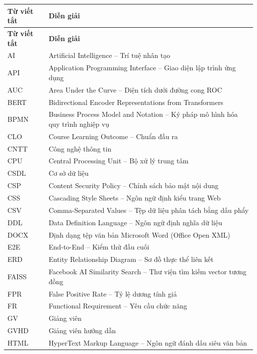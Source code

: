 \documentclass[../main.tex]{subfiles}
\begin{document}
{\renewcommand{\arraystretch}{1.15}
\begin{longtable}{|p{3cm}|p{11cm}|}
\hline
\textbf{Từ viết tắt} & \textbf{Diễn giải} \\
\hline
\endfirsthead
\hline
\textbf{Từ viết tắt} & \textbf{Diễn giải} \\
\hline
\endhead
AI & Artificial Intelligence -- Trí tuệ nhân tạo \\
\hline
API & Application Programming Interface -- Giao diện lập trình ứng dụng \\
\hline
AUC & Area Under the Curve -- Diện tích dưới đường cong ROC \\
\hline
BERT & Bidirectional Encoder Representations from Transformers \\
\hline
BPMN & Business Process Model and Notation -- Ký pháp mô hình hóa quy trình nghiệp vụ \\
\hline
CLO & Course Learning Outcome -- Chuẩn đầu ra \\
\hline
CNTT & Công nghệ thông tin \\
\hline
CPU & Central Processing Unit -- Bộ xử lý trung tâm \\
\hline
CSDL & Cơ sở dữ liệu \\
\hline
CSP & Content Security Policy -- Chính sách bảo mật nội dung \\
\hline
CSS & Cascading Style Sheets -- Ngôn ngữ định kiểu trang Web \\
\hline
CSV & Comma-Separated Values -- Tệp dữ liệu phân tách bằng dấu phẩy \\
\hline
DDL & Data Definition Language -- Ngôn ngữ định nghĩa dữ liệu \\
\hline
DOCX & Định dạng tệp văn bản Microsoft Word (Office Open XML) \\
\hline
E2E & End-to-End -- Kiểm thử đầu cuối \\
\hline
ERD & Entity Relationship Diagram -- Sơ đồ thực thể liên kết \\
\hline
FAISS & Facebook AI Similarity Search -- Thư viện tìm kiếm vector tương đồng \\
\hline
FPR & False Positive Rate -- Tỷ lệ dương tính giả \\
\hline
FR & Functional Requirement -- Yêu cầu chức năng \\
\hline
GV & Giảng viên \\
\hline
GVHD & Giảng viên hướng dẫn \\
\hline
HTML & HyperText Markup Language -- Ngôn ngữ đánh dấu siêu văn bản \\

\end{longtable}}
\end{document}
